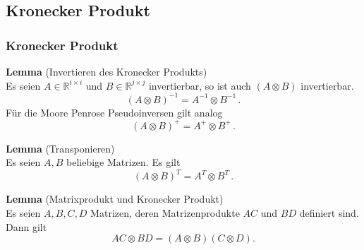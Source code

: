 \subsection{Kronecker Produkt}
\begin{frame}
\frametitle{Kronecker Produkt}

\begin{framed}
\textbf{Lemma}  (Invertieren des Kronecker Produkts) \\
Es seien $A \in \mathbb{R}^{i \times i}$ und $B \in \mathbb{R}^{j \times j}$ invertierbar, so ist auch $(A \otimes B)$ invertierbar. 
\begin{equation*}
(A \otimes B)^{-1} = A^{-1} \otimes B^{-1} \, . 
\end{equation*}
Für die Moore Penrose Pseudoinversen gilt analog
\begin{equation*}
(A \otimes B)^{+} = A^{+} \otimes B^{+} \, .
\end{equation*}
\end{framed}

\end{frame}

\begin{frame}
\begin{framed}
\textbf{Lemma} (Transponieren) \label{lemma:transpose} \\
Es seien $A,B$ beliebige Matrizen. Es gilt
\begin{equation*}
(A \otimes B)^T=A^T \otimes B^T \, .
\end{equation*}
\end{framed}

\begin{framed}
\textbf{Lemma} (Matrixprodukt und Kronecker Produkt) \\
Es seien $A,B,C,D$ Matrizen, deren Matrizenprodukte $AC$ und $BD$ definiert sind. Dann gilt
\begin{equation*}
AC \otimes BD = (A \otimes B)(C \otimes D).
\end{equation*}

\end{framed}

\end{frame}